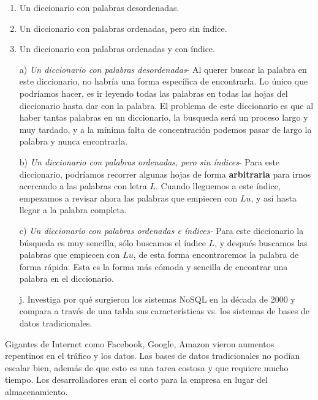 \documentclass{article}
\begin{document}
\begin{enumerate}
\begin{itemize}
    \begin{enumerate}
        \item Un diccionario con palabras desordenadas.
        \item Un diccionario con palabras ordenadas, pero sin índice.
        \item Un diccionario con palabras ordenadas y con índice.
    \end{enumerate}
    \end{itemize}
\begin{itemize}

\item[a)] \textit{Un diccionario con palabras desordenadas}- Al querer buscar la palabra en este diccionario, no habría una forma específica de encontrarla. Lo único que podríamos hacer, es ir leyendo todas las palabras en todas las hojas del diccionario hasta dar con la palabra. El problema de este diccionario es que al haber tantas palabras en un diccionario, la busqueda será un proceso largo y muy tardado, y a la mínima falta de concentración podemos pasar de largo la palabra y nunca encontrarla.\\
\item[b)] \textit{Un diccionario con palabras ordenadas, pero sin índices}- Para este diccionario, podríamos recorrer algunas hojas de forma \textbf{arbitraria} para irnos acercando a las palabras con letra $L$. Cuando lleguemos a este índice, empezamos a revisar ahora las palabras que empiecen con $Lu$, y así hasta llegar a la palabra completa.\\
\item[c)] \textit{Un diccionario con palabras ordenadas e índices-} Para este diccionario la búsqueda es muy sencilla, sólo buscamos el índice $L$, y después buscamos las palabras que empiecen con $Lu$, de esta forma encontraremos la palabra de forma rápida. Esta es la forma más cómoda y sencilla de encontrar una palabra en el diccionario.
\end{itemize}


\begin{itemize}
    \item[j.]Investiga por qué surgieron los sistemas NoSQL en la década de 2000 y compara a través de una tabla sus características vs. los sistemas de bases de datos tradicionales.
    \end{itemize}
    Gigantes de Internet como Facebook, Google, Amazon vieron aumentos repentinos en el tráfico y los datos. Las bases de datos tradicionales no podían escalar bien, además de que esto es una tarea costosa y que requiere mucho tiempo. Los desarrolladores eran el costo para la empresa en lugar del almacenamiento. 
 

\end{enumerate}
\end{document}
